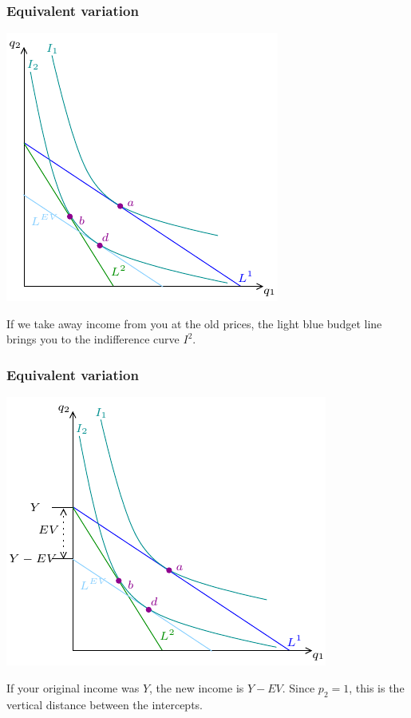 \documentclass[xcolor=pdftex,dvipsnames]{beamer}
\begin{document}
\begin{frame}
\frametitle{Equivalent variation}
\begin{center}
\includegraphics{pics/CVEV5}
\end{center}
If we take away income from you at the old prices, the light blue
budget line brings you to the indifference curve $I^2$.
\end{frame}


\begin{frame}
\frametitle{Equivalent variation}
\begin{center}
\includegraphics{pics/CVEV6}
\end{center}
If your original income was $Y$, the new income is $Y-EV$.
Since $p_2=1$, this is the vertical distance between the intercepts.
\end{frame}
\end{document}
